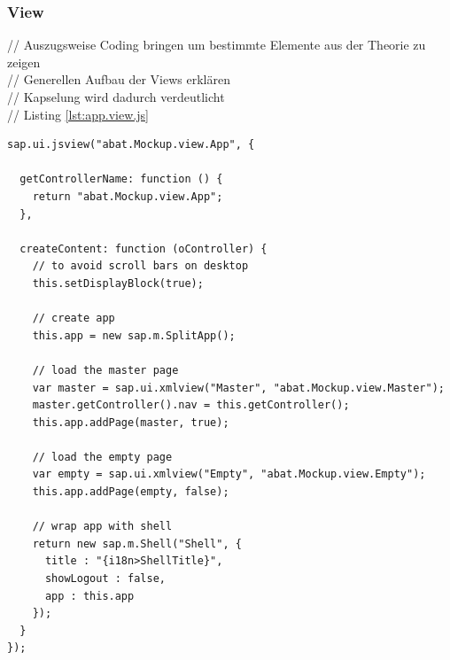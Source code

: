 \documentclass[12pt,a4paper,bibliography=totocnumbered,listof=totocnumbered]{scrartcl}
\begin{document}
\subsubsection{View}
// Auszugsweise Coding bringen um bestimmte Elemente aus der Theorie zu zeigen\\
// Generellen Aufbau der Views erklären\\
// Kapselung wird dadurch verdeutlicht\\
// Listing \ref{lst:app.view.js}
	\vspace{1em}
	\begin{lstlisting}[caption=Root View der Applikation, label=lst:app.view.js]
sap.ui.jsview("abat.Mockup.view.App", {

  getControllerName: function () {
    return "abat.Mockup.view.App";
  },
  
  createContent: function (oController) {
    // to avoid scroll bars on desktop
    this.setDisplayBlock(true);
    
    // create app
    this.app = new sap.m.SplitApp();
    
    // load the master page
    var master = sap.ui.xmlview("Master", "abat.Mockup.view.Master");
    master.getController().nav = this.getController();
    this.app.addPage(master, true);
    
    // load the empty page
    var empty = sap.ui.xmlview("Empty", "abat.Mockup.view.Empty");
    this.app.addPage(empty, false);
    
    // wrap app with shell
    return new sap.m.Shell("Shell", {
      title : "{i18n>ShellTitle}",
      showLogout : false,
      app : this.app
    });
  }
});
	\end{lstlisting}
\end{document}
